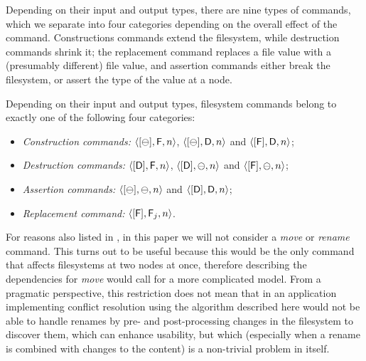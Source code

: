 \myskip
Depending on their input and output types, there are nine types of commands,
which we separate into four categories depending on the overall effect of the command.
Constructions commands extend the filesystem,
while destruction commands shrink it;
the replacement command replaces a file value with a (presumably different) file value,
and assertion commands either break the filesystem, or assert the type of the value at a node.
\begin{mydef}
Depending on their input and output types, filesystem commands
belong to exactly one of the following four categories:
\begin{itemize}
\item[]\emph{Construction commands:}
    $\langle{[\ominus],\mathsf{F},n}\rangle$, $\langle{[\ominus],\mathsf{D},n}\rangle$ and $\langle{[\mathsf{F}],\mathsf{D},n}\rangle$;
\item[]\emph{Destruction commands:}
    $\langle{[\mathsf{D}],\mathsf{F},n}\rangle$, $\langle{[\mathsf{D}],\ominus,n}\rangle$ and $\langle{[\mathsf{F}],\ominus,n}\rangle$;
\item[]\emph{Assertion commands:}
    $\langle{[\ominus],\ominus,n}\rangle$ and $\langle{[\mathsf{D}],\mathsf{D},n}\rangle$;
\item[]\emph{Replacement command:}
    $\langle{[\mathsf{F}],\mathsf{F}_j,n}\rangle$.
\qedhere
\end{itemize}
\end{mydef}



\myskip
For reasons also listed in \cite{NREC}, in this paper we will not consider
a \textit{move} or \textit{rename} command.
This turns out to be useful because this would be the only command that affects
filesystems at two nodes at once, therefore describing 
the dependencies for \textit{move} would call for a more complicated model.
From a pragmatic perspective, this restriction does not mean that in an application
implementing conflict resolution using the algorithm described here would not be
able to handle renames by pre- and post-processing changes in the filesystem to
discover them, which can enhance usability, but which
(especially when a rename is combined with changes to the content)
is a non-trivial problem in itself.
